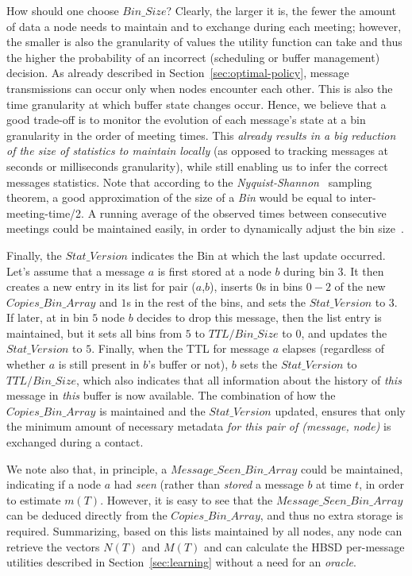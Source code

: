 How should one choose $Bin\_Size$? Clearly, the larger it is, the fewer the amount of data a node needs to maintain and to exchange during each meeting; however, the smaller is also the granularity of values the utility function can take and thus the higher the probability of an incorrect (scheduling or buffer management) decision. As already described in Section~\ref{sec:optimal-policy}, message transmissions can occur only when nodes encounter each other. This is also the time granularity at which buffer state changes occur. Hence, we believe that a good trade-off is to monitor the evolution of each message's state at a bin granularity in the order of meeting times. This \emph{already results in a big reduction of the size of statistics to maintain locally} (as opposed to tracking messages at seconds or milliseconds granularity), while still enabling us to infer the correct messages statistics. Note that  according to the \emph{Nyquist-Shannon}~\cite{Nyquist} sampling theorem, a good approximation of the size of a \emph{Bin} would be equal to inter-meeting-time/2. A running average of the observed times between consecutive meetings could be maintained easily, in order to dynamically adjust the bin size~\cite{akis:ton-multi}. 

Finally, the $Stat\_Version$ indicates the Bin at which the last update occurred. Let's assume that a message $a$ is first stored at a node $b$ during bin $3$. It then creates a new entry in its list for pair ($a$,$b$), inserts $0$s in bins $0-2$ of the new $Copies\_Bin\_Array$ and $1$s in the rest of the bins, and sets the $Stat\_Version$ to $3$. If later, at in bin $5$ node $b$ decides to drop this message, then the list entry is maintained, but it sets all bins from $5$ to $TTL/Bin\_Size$ to $0$, and updates the $Stat\_Version$ to $5$. Finally, when the TTL for message $a$ elapses (regardless of whether $a$ is still present in $b$'s buffer or not), $b$ sets the $Stat\_Version$ to $TTL/Bin\_Size$, which also indicates that all information about the history of \emph{this} message in \emph{this} buffer is now available. The combination of how the $Copies\_Bin\_Array$ is maintained and the $Stat\_Version$ updated, ensures that only the minimum amount of necessary metadata \emph{for this pair of (message, node)} is exchanged during a contact.

We note also that, in principle, a $Message\_Seen\_Bin\_Array$ could be maintained, indicating if a node $a$ had \emph{seen} (rather than \emph{stored} a message $b$ at time $t$, in order to estimate $m(T)$. However, it is easy to see that the $Message\_Seen\_Bin\_Array$ can be deduced directly from the $Copies\_Bin\_Array$, and thus no extra storage is required.
Summarizing, based on this lists maintained by all nodes, any node can retrieve the vectors $N(T)$ and $M(T)$ and can calculate the HBSD per-message utilities described in Section~\ref{sec:learning} without a need for an \emph{oracle}.


